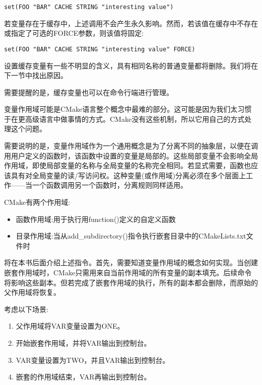 \begin{lstlisting}[style=styleCMake]
set(FOO "BAR" CACHE STRING "interesting value")
\end{lstlisting}

若变量存在于缓存中，上述调用不会产生永久影响。然而，若该值在缓存中不存在或指定了可选的FORCE参数，则该值将固定:

\begin{lstlisting}[style=styleCMake]
set(FOO "BAR" CACHE STRING "interesting value" FORCE)
\end{lstlisting}

设置缓存变量有一些不明显的含义，具有相同名称的普通变量都将删除。我们将在下一节中找出原因。

需要提醒的是，缓存变量也可以在命令行端进行管理。


变量作用域可能是CMake语言整个概念中最难的部分。这可能是因为我们太习惯于在更高级语言中做事情的方式。CMake没有这些机制，所以它用自己的方式处理这个问题。

需要说明的是，变量作用域作为一个通用概念是为了分离不同的抽象层，以便在调用用户定义的函数时，该函数中设置的变量是局部的。这些局部变量不会影响全局作用域，即使局部变量的名称与全局变量的名称完全相同。若显式需要，函数也应该具有对全局变量的读/写访问权。这种变量(或作用域)分离必须在多个层面上工作——当一个函数调用另一个函数时，分离规则同样适用。

CMake有两个作用域:

\begin{itemize}
\item 
函数作用域:用于执行用function()定义的自定义函数

\item 
目录作用域:当从add\_subdirectory()指令执行嵌套目录中的CMakeLists.txt文件时
\end{itemize}

将在本书后面介绍上述指令。首先，需要知道变量作用域的概念如何实现。当创建嵌套作用域时，CMake只需用来自当前作用域的所有变量的副本填充。后续命令将影响这些副本。但若完成了嵌套作用域的执行，所有的副本都会删除，而原始的父作用域将恢复。

考虑以下场景:

\begin{enumerate}
\item 
父作用域将VAR变量设置为ONE。

\item 
开始嵌套作用域，并将VAR输出到控制台。

\item 
VAR变量设置为TWO，并且VAR输出到控制台。

\item 
嵌套的作用域结束，VAR再输出到控制台。
\end{enumerate}

